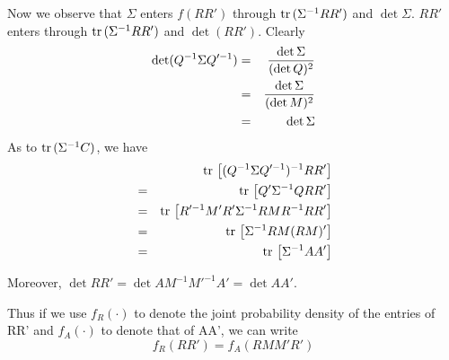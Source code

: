 \documentclass{book}
\begin{document}
Now we observe that $\Sigma$ enters $f(RR')$ through $\text{tr}\, (\Sigma^{-1}
RR')$ and $\det \Sigma$. $RR'$ enters through $\text{tr}\, (\Sigma^{-1}
RR')$ and $\det (RR')$. Clearly
\begin{eqnarray*}
  \det (Q^{-1}\Sigma Q'^{-1}) &=& \det \Sigma \over (\det Q)^2 \\
  &=& \det \Sigma \over (\det M)^2 \\
  &=& \det \Sigma
\end{eqnarray*}
As to $\text{tr}\, (\Sigma^{-1} C)$, we have
\begin{eqnarray*}
  && \text{tr}\,\left[(Q^{-1}\Sigma Q'^{-1})^{-1} RR'\right] \\
  &=& \text{tr}\,\left[Q'\Sigma^{-1} Q RR'\right] \\
  &=& \text{tr}\,\left[ R'^{-1}M'R'\Sigma^{-1} RMR^{-1} RR'\right] \\
  &=& \text{tr}\,\left[ \Sigma^{-1} RM (RM)'\right] \\
  &=& \text{tr}\,\left[ \Sigma^{-1} AA'\right] \\
\end{eqnarray*}

Moreover, $\det RR' = \det AM^{-1} M'^{-1} A' = \det AA'$.

Thus if we use $f_R(\cdot)$ to denote the joint probability density of
the entries of RR' and $f_A(\cdot)$ to denote that of AA', we can
write
\begin{equation}\label{eq:cross-corr-matrix-PDF}
  f_R(RR') = f_A(RMM'R')
\end{equation}
\end{document}
